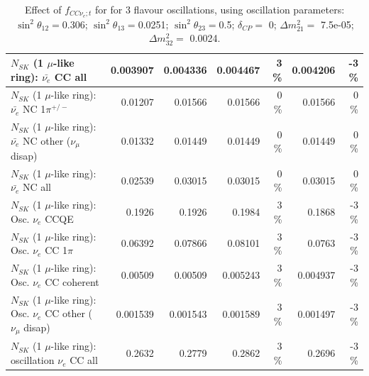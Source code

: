 \begin{table}
\begin{tabular}{| l | r | r | r  r | r  r |}
                            $N_{SK}$ (1 $\mu$-like ring): $\bar{\nu_{e}}$ CC all &        0.003907 &        0.004336 &        0.004467 &        3 \%  &        0.004206 &       -3 \%  \\ 
\hline
                     $N_{SK}$ (1 $\mu$-like ring): $\bar{\nu_e}$ NC 1$\pi^{+/-}$ &         0.01207 &         0.01566 &         0.01566 &        0 \%  &         0.01566 &        0 \%  \\ 
          $N_{SK}$ (1 $\mu$-like ring): $\bar{\nu_e}$ NC other ($\nu_\mu$ disap) &         0.01332 &         0.01449 &         0.01449 &        0 \%  &         0.01449 &        0 \%  \\ 
                            $N_{SK}$ (1 $\mu$-like ring): $\bar{\nu_{e}}$ NC all &         0.02539 &         0.03015 &         0.03015 &        0 \%  &         0.03015 &        0 \%  \\ 
\hline
\hline
\hline
                                 $N_{SK}$ (1 $\mu$-like ring): Osc. $\nu_e$ CCQE &          0.1926 &          0.1926 &          0.1984 &        3 \%  &          0.1868 &       -3 \%  \\ 
                            $N_{SK}$ (1 $\mu$-like ring): Osc. $\nu_e$ CC 1$\pi$ &         0.06392 &         0.07866 &         0.08101 &        3 \%  &          0.0763 &       -3 \%  \\ 
                          $N_{SK}$ (1 $\mu$-like ring): Osc. $\nu_e$ CC coherent &         0.00509 &         0.00509 &        0.005243 &        3 \%  &        0.004937 &       -3 \%  \\ 
           $N_{SK}$ (1 $\mu$-like ring): Osc. $\nu_e$ CC other ($\nu_\mu$ disap) &        0.001539 &        0.001543 &        0.001589 &        3 \%  &        0.001497 &       -3 \%  \\ 
                        $N_{SK}$ (1 $\mu$-like ring): oscillation $\nu_e$ CC all &          0.2632 &          0.2779 &          0.2862 &        3 \%  &          0.2696 &       -3 \%  \\ 
\hline
\hline
\end{tabular}
\caption{ Effect of $f_{CC\nu_e; t}$ for for 3 flavour oscillations, using oscillation parameters:  $\sin^2\theta_{12} = $0.306; $\sin^2\theta_{13} = $0.0251; $\sin^2\theta_{23} = $0.5; $\delta_{CP} = $        0; $\Delta m^2_{21} = $    7.5e-05; $\Delta m^2_{32} = $    0.0024. }
\label{tab:num_xsec_norm_nuetonumu_1RmuT_3f_osc_t13:0.0251}
\end{table}
\clearpage
